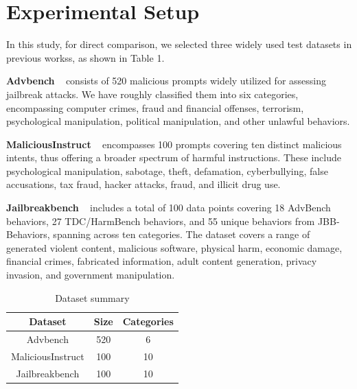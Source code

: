 


\section{Experimental Setup}\label{exp_setup}


In this study, for direct comparison, we selected three widely used test datasets in previous workss, as shown in Table 1. ~\cite{huang2024catastrophic, li2024drattack, chao2023jailbreaking, zhou2024speak}

\textbf{Advbench} ~\cite{zou2023universal} consists of 520 malicious prompts widely utilized for assessing jailbreak attacks. We have roughly classified them into six categories, encompassing computer crimes, fraud and financial offenses, terrorism, psychological manipulation, political manipulation, and other unlawful behaviors.

\textbf{MaliciousInstruct} ~\cite{huang2024catastrophic} encompasses 100 prompts covering ten distinct malicious intents, thus offering a broader spectrum of harmful instructions. These include psychological manipulation, sabotage, theft, defamation, cyberbullying, false accusations, tax fraud, hacker attacks, fraud, and illicit drug use.

\textbf{Jailbreakbench} ~\cite{chao2024jailbreakbench} includes a total of 100 data points covering 18 AdvBench behaviors, 27 TDC/HarmBench behaviors, and 55 unique behaviors from JBB-Behaviors, spanning across ten categories. The dataset covers a range of generated violent content, malicious software, physical harm, economic damage, financial crimes, fabricated information, adult content generation, privacy invasion, and government manipulation.

\begin{table}[h]
\begin{center}
    
\begin{tabular}{c|c|c} 
\hline
{Dataset} & {Size} & {Categories} \\ \hline
Advbench & 520 & 6  \\ 
MaliciousInstruct & 100 & 10   \\ 
Jailbreakbench & 100 & 10   \\ 
\hline
\end{tabular}
\vspace*{-.6em}
\caption{Dataset summary}
\label{table:dataset}

\end{center}
\vspace*{-2em}
\end{table}

